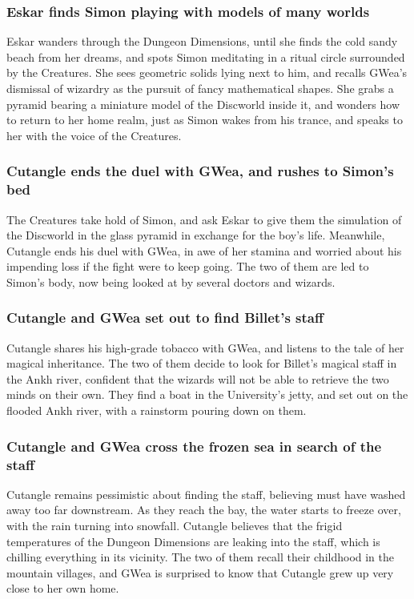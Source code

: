 \subsubsection{\Gls{Eskar} finds \Gls{Simon} playing with models of many worlds}
\Gls{Eskar} wanders through the Dungeon Dimensions, until she finds the cold sandy beach from her
dreams, and spots \Gls{Simon} meditating in a ritual circle surrounded by the Creatures. She sees
geometric solids lying next to him, and recalls \Gls{GWea}'s dismissal of wizardry as the pursuit
of fancy mathematical shapes. She grabs a pyramid bearing a miniature model of the Discworld inside
it, and wonders how to return to her home realm, just as \Gls{Simon} wakes from his trance, and
speaks to her with the voice of the Creatures.

\subsubsection{\Gls{Cutangle} ends the duel with \Gls{GWea}, and rushes to \Gls{Simon}'s bed}
The Creatures take hold of \Gls{Simon}, and ask \Gls{Eskar} to give them the simulation of the
Discworld in the glass pyramid in exchange for the boy's life. Meanwhile, \Gls{Cutangle} ends his
duel with \Gls{GWea}, in awe of her stamina and worried about his impending loss if the fight were
to keep going. The two of them are led to \Gls{Simon}'s body, now being looked at by several doctors
and wizards.

\subsubsection{\Gls{Cutangle} and \Gls{GWea} set out to find \Gls{Billet}'s staff}
\Gls{Cutangle} shares his high-grade tobacco with \Gls{GWea}, and listens to the tale of her
magical inheritance. The two of them decide to look for \Gls{Billet}'s magical staff in the Ankh
river, confident that the wizards will not be able to retrieve the two minds on their own. They
find a boat in the University's jetty, and set out on the flooded Ankh river, with a rainstorm
pouring down on them.

\subsubsection{\Gls{Cutangle} and \Gls{GWea} cross the frozen sea in search of the staff}
\Gls{Cutangle} remains pessimistic about finding the staff, believing must have washed away too far
downstream. As they reach the bay, the water starts to freeze over, with the rain turning into
snowfall. \Gls{Cutangle} believes that the frigid temperatures of the Dungeon Dimensions are leaking
into the staff, which is chilling everything in its vicinity. The two of them recall their
childhood in the mountain villages, and \Gls{GWea} is surprised to know that \Gls{Cutangle} grew up
very close to her own home.

